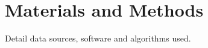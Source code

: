 \documentclass[notitlepage]{article}
\begin{document}
\section{Materials and Methods}
Detail data sources, software and algorithms used.
\begin{comment}
\begin{figure}[h]
\centering
\texttt{[image: CoordinatedRSquareComparison.pdf]}
\caption{
  Proteins in the global cluster fit reasonably well to the global cluster itself
}
\label{fig:globalfit}
\end{figure}

\begin{figure}[h]
\centering
\texttt{[image: GlobalClusterCorr.pdf]}
\caption{
Proteins that have a high correlation (0.4-0.8) with growth rate mostly have even higher correlation to the sum of these proteins (both weighted sum and normalized sum are presented).
Weighted sum means the concentrations of all proteins in the group are summed.
Normalized sum means every protein is first normalized to have an average concentration of 1 across the different growth conditions, and then all proteins in the group are summed.
The higher correlation indicates that their response is coordinated (they scale by the same factor between conditions).
}
\label{globalcorr}
\end{figure}

\begin{figure}[h]
\centering
\texttt{[image: GlobalClusterRSquare.pdf]}
\caption{
Plotting the $r^2$ distribution shows that a large fraction of the variability of these proteins is captured by the global response.
}
\label{globalrsq}
\end{figure}

\begin{itemize}
\item This happens in multiple organisms and data sets (show yeast, two data sets of coli). Possibly add mRNA measurements ??.
\end{itemize}
\end{comment}
\printbibliography
\end{document}
